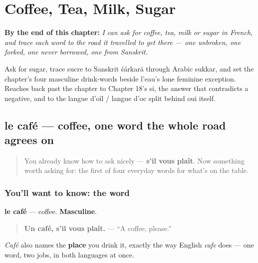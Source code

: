 
\chapter{Coffee, Tea, Milk, Sugar}
\label{ch:fr-coffee-tea-milk-sugar}

\begin{chapteropening}
\textbf{By the end of this chapter:} \emph{I can ask for coffee, tea, milk or sugar in French, and trace each word to the road it travelled to get there — one unbroken, one forked, one never borrowed, one from Sanskrit.}

Ask for sugar, trace sucre to Sanskrit śárkarā through Arabic sukkar, and set the chapter's four masculine drink-words beside l'eau's lone feminine exception. Reaches back past the chapter to Chapter 18's si, the answer that contradicts a negative, and to the langue d'oïl / langue d'oc split behind oui itself.
\end{chapteropening}

\section[le café]{le café — coffee, one word the whole road agrees on}

\label{lesson:FR-C28-cafe}



\begin{quote}
You already know how to ask nicely — \textbf{s'il vous plaît}. Now something worth asking for: the first of four everyday words for what's on the table.
\end{quote}

\subsection*{You'll want to know: the word}
\textbf{le café} — coffee. \textbf{Masculine}.

\begin{quote}
\textbf{Un café, s'il vous plaît.} — \textquotedblleft{}A coffee, please.\textquotedblright{}
\end{quote}

\emph{Café} also names the \textbf{place} you drink it, exactly the way English \emph{cafe} does — one word, two jobs, in both languages at once.

